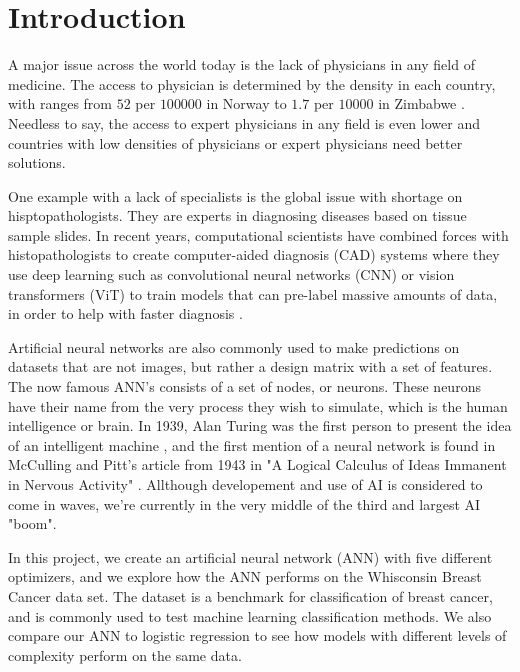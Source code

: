 \section{Introduction}\label{sec:introduction}

A major issue across the world today is the lack of physicians in any field of medicine. The access to physician is determined by the 
density in each country, with ranges from $52$ per $10 0000$ in Norway to $1.7$ per $10 000$ in Zimbabwe \cite{who_physicians}. Needless to say, 
the access to expert physicians in any field is even lower and countries with low densities of physicians or expert physicians need better
solutions. 

One example with a lack of specialists is the global issue with shortage on hisptopathologists. They are experts in diagnosing 
diseases based on tissue sample slides. In recent years, computational scientists have combined forces with histopathologists to create computer-aided 
diagnosis (CAD) systems where they use deep learning such as convolutional neural networks (CNN) or vision transformers (ViT)
to train models that can pre-label massive amounts of data, in order to help with faster diagnosis \cite{histopath_AI}.

Artificial neural networks are also commonly used to make predictions on datasets that are not images, but rather a design matrix with a set of features.
The now famous ANN's consists of a set of nodes, or neurons. These neurons have their name from the very process they wish to simulate, which is the
human intelligence or brain. In 1939, Alan Turing was the first person to present the idea of an intelligent machine \cite{turing_36}, and the first mention of a 
neural network is found in McCulling and Pitt's article from 1943 in "A Logical Calculus of Ideas Immanent in Nervous Activity" \cite{mccu_pitt}. 
Allthough developement and use of AI is considered to come in waves, we're currently in the very middle of the third and largest AI "boom". 

In this project, we create an artificial neural network (ANN) with five different optimizers, and we explore how the ANN performs on the 
Whisconsin Breast Cancer data set. The dataset is a benchmark for classification of breast cancer, and is commonly used to test machine learning 
classification methods. We also compare our ANN to logistic regression to see how models with different levels of complexity perform on the same data. 

